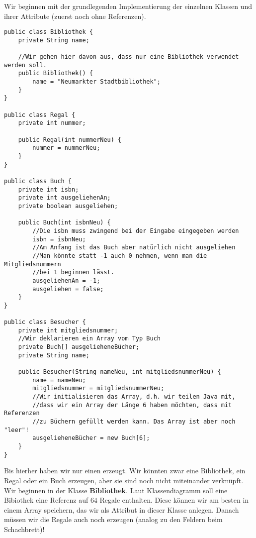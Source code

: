 \documentclass{article}
\begin{document}
Wir beginnen mit der grundlegenden Implementierung der einzelnen Klassen und ihrer Attribute (zuerst noch ohne Referenzen). 
\newpage
\begin{verbatim}
public class Bibliothek {
    private String name;

    //Wir gehen hier davon aus, dass nur eine Bibliothek verwendet werden soll.
    public Bibliothek() {
        name = "Neumarkter Stadtbibliothek";
    }
}

public class Regal {
    private int nummer;

    public Regal(int nummerNeu) {
        nummer = nummerNeu;
    } 
}

public class Buch {
    private int isbn;
    private int ausgeliehenAn;
    private boolean ausgeliehen;

    public Buch(int isbnNeu) {
        //Die isbn muss zwingend bei der Eingabe eingegeben werden
        isbn = isbnNeu;
        //Am Anfang ist das Buch aber natürlich nicht ausgeliehen
        //Man könnte statt -1 auch 0 nehmen, wenn man die Mitgliedsnummern
        //bei 1 beginnen lässt.
        ausgeliehenAn = -1;
        ausgeliehen = false;
    }
}

public class Besucher {
    private int mitgliedsnummer; 
    //Wir deklarieren ein Array vom Typ Buch 
    private Buch[] ausgelieheneBücher;
    private String name;

    public Besucher(String nameNeu, int mitgliedsnummerNeu) {
        name = nameNeu;
        mitgliedsnummer = mitgliedsnummerNeu;
        //Wir initialisieren das Array, d.h. wir teilen Java mit,
        //dass wir ein Array der Länge 6 haben möchten, dass mit Referenzen
        //zu Büchern gefüllt werden kann. Das Array ist aber noch "leer"!
        ausgelieheneBücher = new Buch[6];
    }
}
\end{verbatim}
Bis hierher haben wir nur einen  erzeugt. Wir könnten zwar eine Bibliothek, ein Regal oder ein Buch erzeugen, aber sie sind noch nicht miteinander verknüpft. Wir beginnen in der Klasse \textbf{Bibliothek}. Laut Klassendiagramm soll eine Bibiothek eine Referenz auf $64$ Regale enthalten. Diese können wir am besten in einem Array speichern, das wir als Attribut in dieser Klasse anlegen. Danach müssen wir die Regale auch noch erzeugen (analog zu den Feldern beim Schachbrett)!
\end{document}
